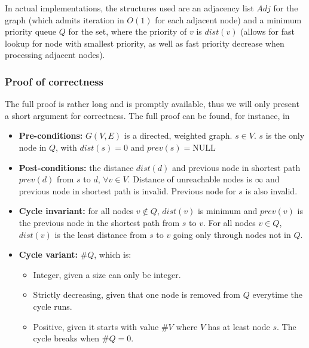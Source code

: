 \documentclass{report}[a4paper]
\theoremstyle{remark}
\begin{document}
In actual implementations, the structures used are an adjacency list $Adj$ for the graph (which admits iteration in $O(1)$ for each adjacent node) and a minimum priority queue $Q$ for the set, where the priority of $v$ is $dist(v)$ (allows for fast lookup for node with smallest priority, as well as fast priority decrease when processing adjacent nodes).
\subsubsection{Proof of correctness}
The full proof is rather long and is promptly available, thus we will only present a short argument for correctness. The full proof can be found, for instance, in \cite[p.~659]{intro-alg}
\begin{itemize}
    \item \textbf{Pre-conditions:} $G(V, E)$ is a directed, weighted graph. $s \in V$. $s$ is the only node in $Q$, with $dist(s)=0$ and $prev(s)=\text{NULL}$
    \item \textbf{Post-conditions:} the distance $dist(d)$ and previous node in shortest path $prev(d)$ from $s$ to $d$, $\forall v \in V$. Distance of unreachable nodes is $\infty$ and previous node in shortest path is invalid. Previous node for $s$ is also invalid.
    \item \textbf{Cycle invariant:} for all nodes $v \not \in Q$, $dist(v)$ is minimum and $prev(v)$ is the previous node in the shortest path from $s$ to $v$. For all nodes $v \in Q$, $dist(v)$ is the least distance from $s$ to $v$ going only through nodes not in $Q$.\par
    \item \textbf{Cycle variant:} $\#Q$, which is:
    \begin{itemize}
        \item Integer, given a size can only be integer.
        \item Strictly decreasing, given that one node is removed from $Q$ everytime the cycle runs.
        \item Positive, given it starts with value $\#V$ where $V$ has at least node $s$. The cycle breaks when $\#Q = 0$.
    \end{itemize}
\end{itemize}
\end{document}
